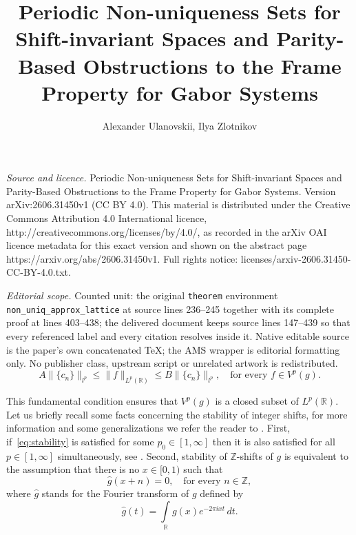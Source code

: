 \documentclass[10pt,a4paper]{amsart}
\numberwithin{equation}{section}
\newcommand{\R}{{\mathbb R}} \newcommand{\Q}{{\mathbb Q}} \newcommand{\Z}{{\mathbb Z}} \newcommand{\N}{{\mathbb N}}
\begin{document}
\title[Periodic Non-uniqueness Sets for Shift-invariant Spaces and ]{Periodic Non-uniqueness Sets for Shift-invariant Spaces and Parity-Based Obstructions to the Frame Property for Gabor Systems}
\author{Alexander Ulanovskii, Ilya Zlotnikov}
\date{}
\maketitle
\noindent\emph{Source and licence.} Periodic Non-uniqueness Sets for Shift-invariant Spaces and Parity-Based Obstructions to the Frame Property for Gabor Systems. Version arXiv:2606.31450v1 (CC BY 4.0). This material is distributed under the Creative Commons Attribution 4.0 International licence, http://creativecommons.org/licenses/by/4.0/, as recorded in the arXiv OAI licence metadata for this exact version and shown on the abstract page https://arxiv.org/abs/2606.31450v1. Full rights notice: licenses/arxiv-2606.31450-CC-BY-4.0.txt.\par\smallskip
\noindent\textit{Editorial scope.} Counted unit: the original \texttt{theorem} environment \texttt{non\_uniq\_approx\_lattice} at source lines 236--245 together with its complete proof at lines 403--438; the delivered document keeps source lines 147--439 so that every referenced label and every citation resolves inside it. Native editable source is the paper's own concatenated TeX; the AMS wrapper is editorial formatting only. No publisher class, upstream script or unrelated artwork is redistributed.
\begin{equation}\label{eq:stability}
  A\|\{c_n\}\|_{l^p} \leq \|f\|_{L^p(\R)} \leq B\|\{c_n\}\|_{l^p}, \quad \text{for every } f\in V^p(g).  
\end{equation}

This fundamental condition ensures that $V^p(g)$ is a closed subset of $L^p(\R).$ Let us briefly recall some facts concerning the stability of integer shifts, for more information and some generalizations we refer the reader to \cite{MR3336091, Jia1991, MR1850960, MR4950401}.
First, if~\eqref{eq:stability} is satisfied for some $p_0 \in [1, \infty]$ then it is also satisfied for all $p \in [1, \infty]$ simultaneously, see \cite{MR3336091}.
Second, stability of $\Z$-shifts of $g$ is equivalent to the assumption that there is no $x\in[0,1)$ such that
\begin{equation}\label{eq:stability_fourier}
    \hat{g}(x+n) = 0, \quad\text{for every } n\in \Z,
\end{equation}
where $\hat{g}$ stands for the Fourier transform of $g$ defined by
$$
\hat{g}(t) = \int\limits_{\R} g(x) e^{-2\pi i xt}\, dt.
$$
\end{document}
